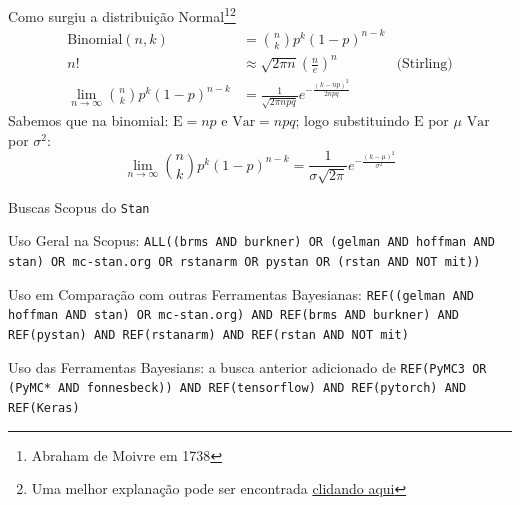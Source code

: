 \documentclass[aspectratio=169]{beamer}                    %
\begin{document}
\begin{frame}[plain, noframenumbering, label=appendixnormal]{Como surgiu a distribuição Normal\footnote{Abraham de Moivre em 1738}\footnote{Uma melhor explanação pode ser encontrada \href{http://www.stat.yale.edu/~pollard/Courses/241.fall2014/notes2014/Bin.Normal.pdf}{clidando aqui}}}
  $$
  \begin{aligned}
    \text{Binomial}(n, k) &= \binom{n}{k} p^k (1-p)^{n-k} \\
    n! &\approx \sqrt{2 \pi n} \left(\frac{n}{e}\right)^n &\text{(Stirling)} \\
    \lim_{n \to \infty} \binom{n}{k} p^k (1-p)^{n-k} &= \frac{1}{\sqrt{2 \pi npq}} e^{-\frac{(k - np)^2}{2npq}}
  \end{aligned}
  $$
  Sabemos que na binomial: $\mathrm{E} = np$ e $\mathrm{Var} = npq$; logo substituindo $\mathrm{E}$ por $\mu$ $\mathrm{Var}$ por $\sigma^2$:
  $$\lim_{n \to \infty} \binom{n}{k} p^k (1-p)^{n-k} = \frac{1}{\sigma \sqrt{2 \pi}} e^{-\frac{(k - \mu)^2}{\sigma^2}}$$
\end{frame}

\begin{frame}[plain, noframenumbering, label=appendixscopus]{Buscas Scopus do \texttt{Stan}}
  \begin{vfilleditems}
      \item Uso Geral na Scopus: \texttt{ALL((brms AND burkner) OR (gelman AND hoffman AND stan) OR mc-stan.org OR rstanarm OR pystan OR (rstan AND NOT mit))}
      \item Uso em Comparação com outras Ferramentas Bayesianas: \texttt{REF((gelman AND hoffman AND stan) OR mc-stan.org) AND REF(brms AND burkner) AND REF(pystan) AND REF(rstanarm) AND REF(rstan AND NOT mit)}
      \item Uso das Ferramentas Bayesians: a busca anterior adicionado de \texttt{REF(PyMC3 OR (PyMC* AND fonnesbeck)) AND REF(tensorflow) AND REF(pytorch) AND REF(Keras)}
  \end{vfilleditems}
\end{frame}
\end{document}
